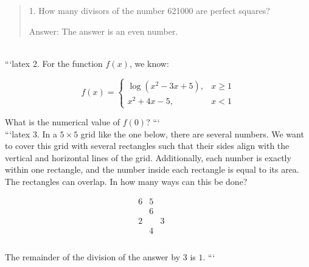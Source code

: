\begin{quote}
1. How many divisors of the number 621000 are perfect squares?

Answer: The answer is an even number.
\end{quote}
\\
```latex
2. For the function \( f(x) \), we know:

\[
f(x) = 
\begin{cases} 
\log(x^2 - 3x + 5), & x \geq 1 \\ 
x^2 + 4x - 5, & x < 1 
\end{cases}
\]

What is the numerical value of \( f(0) \)?
```
\\
```latex
3. In a $5 \times 5$ grid like the one below, there are several numbers. We want to cover this grid with several rectangles such that their sides align with the vertical and horizontal lines of the grid. Additionally, each number is exactly within one rectangle, and the number inside each rectangle is equal to its area. The rectangles can overlap. In how many ways can this be done?

\[
\begin{array}{ccccc}
6 & 5 & & & \\
& 6 & & & \\
2 & & 3 & & \\
& 4 & & & \\
& & & & \\
\end{array}
\]

The remainder of the division of the answer by $3$ is $1$.
```

\\
\documentclass{article}
\usepackage{amsmath}


4. As shown in the figure below, we have drawn two squares with side lengths of 40 and 20 centimeters next to each other. A rod with a length of 10 centimeters is completely painted and moved in such a way that the two ends of the rod are in two different squares. If we consider the thickness of the rod to be negligible, by moving the rod, what is the maximum area in square centimeters that will be painted from the two squares?

\begin{enumerate}
    \item $25\pi + 200$
    \item $25\pi + 300$
    \item $400$
    \item $25\pi + 400$
    \item $500$
\end{enumerate}


